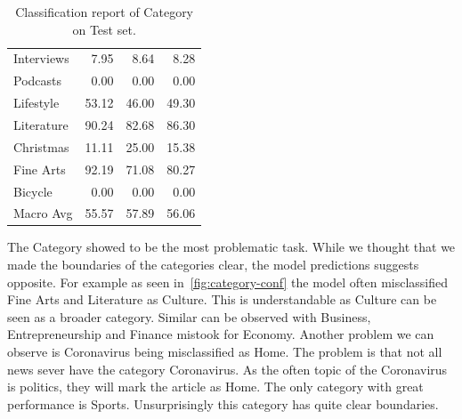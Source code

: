 \begin{table}[H]
\begin{tabular}{lrrr}
        Interviews             & 7.95      & 8.64   & 8.28  \\
        Podcasts               & 0.00      & 0.00   & 0.00  \\
        Lifestyle              & 53.12     & 46.00  & 49.30 \\
        Literature             & 90.24     & 82.68  & 86.30 \\
        Christmas              & 11.11     & 25.00  & 15.38 \\
        Fine Arts              & 92.19     & 71.08  & 80.27 \\
        Bicycle                & 0.00      & 0.00   & 0.00  \\
        Macro Avg              & 55.57     & 57.89  & 56.06 \\
        \bottomrule
    \end{tabular}
    \caption{Classification report of Category on Test set.}
    \label{tab:classification-report-category}
\end{table}
The Category showed to be the most problematic task. While we thought that
we made the boundaries of the categories clear, the model predictions
suggests opposite. For example as seen in~\autoref{fig:category-conf}
the model often misclassified Fine Arts and Literature as Culture.
This is understandable
as Culture can be seen as a broader category. Similar can be observed with
Business, Entrepreneurship and Finance mistook for Economy. Another problem
we can observe is Coronavirus being misclassified as Home. The problem
is that not all news sever have the category Coronavirus. As the often topic of
the Coronavirus is politics, they will mark the article as Home. The only category
with great performance is Sports. Unsurprisingly this category has quite
clear boundaries.

